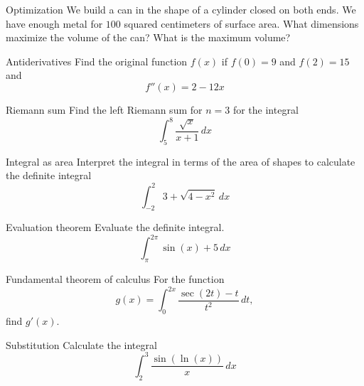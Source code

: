 \documentclass[t]{beamer}
\begin{document}
\begin{frame}{Optimization}
We build a can in the shape of a cylinder closed on both ends.  We have enough metal for $100$ squared centimeters of surface area.  What dimensions maximize the volume of the can?  What is the maximum volume?
\end{frame}

\begin{frame}{Antiderivatives}
Find the original function $f(x)$ if $f(0) = 9$ and $f(2) = 15$ and
$$f''(x) = 2 - 12x$$
\end{frame}

\begin{frame}{Riemann sum}
Find the left Riemann sum for $n=3$ for the integral 
$$\int_5^8 \frac{\sqrt{x}}{x + 1} \, dx $$
\end{frame}

\begin{frame}{Integral as area}
Interpret the integral in terms of the area of shapes to calculate the
definite integral
$$\int_{-2}^2  3 + \sqrt{4 - x^2} \, dx $$
\end{frame}

\begin{frame}{Evaluation theorem}
Evaluate the definite integral.
$$\int_{\pi}^{2 \pi} \sin(x) + 5 \, dx $$
\end{frame}

\begin{frame}{Fundamental theorem of calculus}
For the function 
$$g(x) = \int_0^{2x} \frac{ \sec(2t) - t } {t^2} \, dt,$$
find $g'(x)$.
\end{frame}

\begin{frame}{Substitution}
Calculate the integral 
$$ \int_2^3 \frac{\sin(\ln(x))}{x} \, dx $$
\end{frame}
\end{document}
